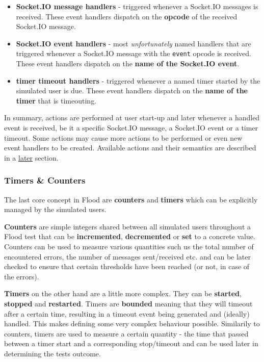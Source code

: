 \documentclass[a4paper]{article}
\begin{document}
\begin{itemize}
\item \textbf{Socket.IO message handlers} - triggered whenever a Socket.IO messages is received. These event handlers dispatch on the \textbf{opcode} of the received Socket.IO message.
\item \textbf{Socket.IO event handlers} - most \emph{unfortunately} named handlers that are triggered whenever a Socket.IO message with the \texttt{event} opcode is received. These event handlers dispatch on the \textbf{name of the Socket.IO event}.
\item \textbf{timer timeout handlers} - triggered whenever a named timer started by the simulated user is due. These event handlers dispatch on the \textbf{name of the timer} that is timeouting.
\end{itemize}

\noindent
In summary, actions are performed at user start-up and later whenever a handled event is received, be it a specific Socket.IO message, a Socket.IO event or a timer timeout. Some actions may cause more actions to be performed or even new event handlers to be created. Available actions and their semantics are described in a \hyperref[sec-3-5]{later} section.
\subsubsection{Timers \& Counters}
\label{sec-2-2-4}

The last core concept in Flood are \textbf{counters} and \textbf{timers} which can be explicitly managed by the simulated users.

\noindent
\textbf{Counters} are simple integers shared between all simulated users throughout a Flood test that can be \textbf{incremented}, \textbf{decremented} or \textbf{set} to a concrete value. Counters can be used to measure various quantities such us the total number of encountered errors, the number of messages sent/received etc. and can be later checked to ensure that certain thresholds have been reached (or not, in case of the errors).

\noindent
\textbf{Timers} on the other hand are a little more complex. They can be \textbf{started}, \textbf{stopped} and \textbf{restarted}. Timers are \textbf{bounded} meaning that they will timeout after a certain time, resulting in a timeout event being generated and (ideally) handled. This makes defining some very complex behaviour possible. Similarily to counters, timers are used to measure a certain quantity - the time that passed between a timer start and a corresponding stop/timeout and can be used later in determining the tests outcome.
\end{document}
